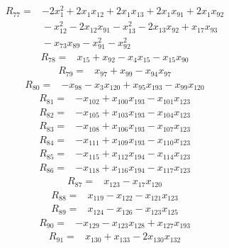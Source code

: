 \begin{align*}
R_{77} ={}& -2x_{1}^{2} + 2x_{1} x_{12} + 2x_{1} x_{13} + 2x_{1} x_{91} + 2x_{1} x_{92} \\
&{} -x_{12}^{2} - 2x_{12} x_{91} - x_{13}^{2} - 2x_{13} x_{92} + x_{17} x_{93} \\
&{} -x_{73} x_{89} - x_{91}^{2} - x_{92}^{2}
\end{align*}
\begin{align*}
R_{78} ={}& x_{15} + x_{92} - x_{4} x_{15} - x_{15} x_{90}
\end{align*}
\begin{align*}
R_{79} ={}& x_{97} + x_{99} - x_{94} x_{97}
\end{align*}
\begin{align*}
R_{80} ={}& -x_{98} - x_{3} x_{120} + x_{95} x_{193} - x_{99} x_{120}
\end{align*}
\begin{align*}
R_{81} ={}& -x_{102} + x_{100} x_{193} - x_{101} x_{123}
\end{align*}
\begin{align*}
R_{82} ={}& -x_{105} + x_{103} x_{193} - x_{104} x_{123}
\end{align*}
\begin{align*}
R_{83} ={}& -x_{108} + x_{106} x_{193} - x_{107} x_{123}
\end{align*}
\begin{align*}
R_{84} ={}& -x_{111} + x_{109} x_{193} - x_{110} x_{123}
\end{align*}
\begin{align*}
R_{85} ={}& -x_{115} + x_{112} x_{194} - x_{114} x_{123}
\end{align*}
\begin{align*}
R_{86} ={}& -x_{118} + x_{116} x_{194} - x_{117} x_{123}
\end{align*}
\begin{align*}
R_{87} ={}& x_{123} - x_{17} x_{120}
\end{align*}
\begin{align*}
R_{88} ={}& x_{119} - x_{122} - x_{121} x_{123}
\end{align*}
\begin{align*}
R_{89} ={}& x_{124} - x_{126} - x_{123} x_{125}
\end{align*}
\begin{align*}
R_{90} ={}& -x_{129} - x_{123} x_{128} + x_{127} x_{193}
\end{align*}
\begin{align*}
R_{91} ={}& x_{130} + x_{133} - 2x_{130} x_{132}
\end{align*}
